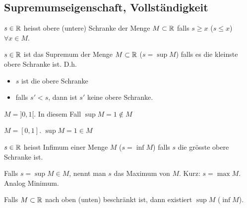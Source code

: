 \subsection{Supremumseigenschaft, Vollständigkeit}
\begin{Def}
  $s\in\mathbb{R}$ heisst obere (untere) Schranke der Menge $M\subset \mathbb{R}$ falls $s\geq x$ ($s\leq x$) $\forall x\in M$.
\end{Def}
\begin{Def}
  $s\in\mathbb{R}$ ist das Supremum der Menge $M\subset\mathbb{R}$ ($s=\sup M$)
falls es die kleinste obere Schranke ist. D.h.
  \begin{itemize}
    \item $s$ ist die obere Schranke
    \item falls $s'<s$, dann ist $s'$ keine obere Schranke.
  \end{itemize}
\end{Def}
\begin{Bsp}
  $M=]0,1[$. In diesem Fall $\sup M=1 \not\in M$
\end{Bsp}
\begin{Bsp}
  $M=[0,1]$. $\sup M=1\in M$
\end{Bsp}
\begin{Def}
  $s\in\mathbb{R}$ heisst Infimum einer Menge $M$ ($s=\inf M$) falls $s$ die grösste obere Schranke ist.
\end{Def}
\begin{Def}
  Falls $s=\sup M\in M$, nennt man $s$ das Maximum von $M$. Kurz: $s=\max M$. Analog Minimum.
\end{Def}
\begin{Sat}
  Falls $M\subset \mathbb{R}$ nach oben (unten) beschränkt ist, dann existiert $\sup M$ ($\inf M$).
\end{Sat}
